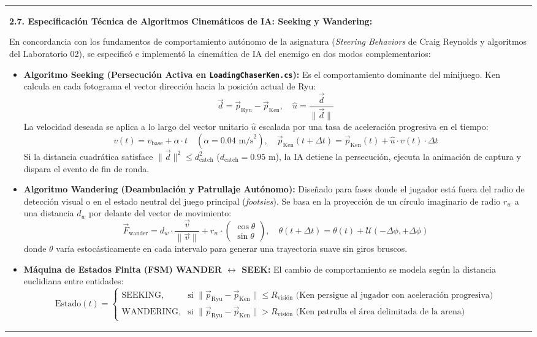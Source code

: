 \documentclass[10pt,a4paper]{article}
\begin{document}
{\begin{tabularx}{\textwidth}{|X|}
{    \vspace{0.15cm}
    \textbf{2.7. Especificación Técnica de Algoritmos Cinemáticos de IA: Seeking y Wandering:}\par
    En concordancia con los fundamentos de comportamiento autónomo de la asignatura (\textit{Steering Behaviors} de Craig Reynolds y algoritmos del Laboratorio 02), se especificó e implementó la cinemática de IA del enemigo en dos modos complementarios:
    \begin{itemize}[noitemsep,topsep=2pt]
        \item \textbf{Algoritmo Seeking (Persecución Activa en \texttt{LoadingChaserKen.cs}):}
        Es el comportamiento dominante del minijuego. Ken calcula en cada fotograma el vector dirección hacia la posición actual de Ryu:
        $$\vec{d} = \vec{p}_{\text{Ryu}} - \vec{p}_{\text{Ken}}, \quad \hat{u} = \frac{\vec{d}}{\|\vec{d}\|}$$
        La velocidad deseada se aplica a lo largo del vector unitario $\hat{u}$ escalada por una tasa de aceleración progresiva en el tiempo:
        $$v(t) = v_{\text{base}} + \alpha \cdot t \quad (\alpha = 0.04\text{ m/s}^2), \quad \vec{p}_{\text{Ken}}(t + \Delta t) = \vec{p}_{\text{Ken}}(t) + \hat{u} \cdot v(t) \cdot \Delta t$$
        Si la distancia cuadrática satisface $\|\vec{d}\|^2 \le d_{\text{catch}}^2$ ($d_{\text{catch}} = 0.95$ m), la IA detiene la persecución, ejecuta la animación de captura y dispara el evento de fin de ronda.
        \item \textbf{Algoritmo Wandering (Deambulación y Patrullaje Autónomo):}
        Diseñado para fases donde el jugador está fuera del radio de detección visual o en el estado neutral del juego principal (\textit{footsies}). Se basa en la proyección de un círculo imaginario de radio $r_w$ a una distancia $d_w$ por delante del vector de movimiento:
        $$\vec{F}_{\text{wander}} = d_w \cdot \frac{\vec{v}}{\|\vec{v}\|} + r_w \cdot \begin{pmatrix} \cos \theta \\ \sin \theta \end{pmatrix}, \quad \theta(t + \Delta t) = \theta(t) + \mathcal{U}(-\Delta \phi, +\Delta \phi)$$
        donde $\theta$ varía estocásticamente en cada intervalo para generar una trayectoria suave sin giros bruscos.
        \item \textbf{Máquina de Estados Finita (FSM) WANDER $\leftrightarrow$ SEEK:}
        El cambio de comportamiento se modela según la distancia euclidiana entre entidades:
        $$\text{Estado}(t) = \begin{cases} \text{SEEKING}, & \text{si } \|\vec{p}_{\text{Ryu}} - \vec{p}_{\text{Ken}}\| \le R_{\text{visión}} \text{ (Ken persigue al jugador con aceleración progresiva)} \\ \text{WANDERING}, & \text{si } \|\vec{p}_{\text{Ryu}} - \vec{p}_{\text{Ken}}\| > R_{\text{visión}} \text{ (Ken patrulla el área delimitada de la arena)} \end{cases}$$

\end{itemize}}
\end{tabularx}}
\end{document}

